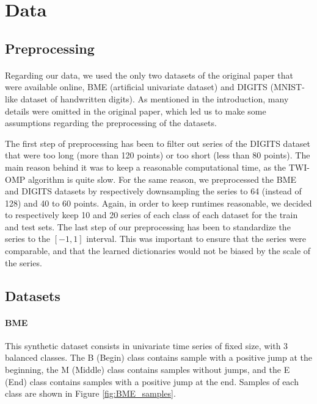 \documentclass[11pt]{article}
\begin{document}
\section{Data}

\subsection{Preprocessing}

\paragraph{} Regarding our data, we used the only two datasets of the original paper that were available online, BME (artificial univariate dataset) and DIGITS (MNIST-like dataset of handwritten digits). As mentioned in the introduction, many details were omitted in the original paper, which led us to make some assumptions regarding the preprocessing of the datasets. 

The first step of preprocessing has been to filter out series of the DIGITS dataset that were too long (more than 120 points) or too short (less than 80 points). The main reason behind it was to keep a reasonable computational time, as the TWI-OMP algorithm is quite slow. For the same reason, we preprocessed the BME and DIGITS datasets by respectively downsampling the series to 64 (instead of 128) and 40 to 60 points. Again, in order to keep runtimes reasonable, we decided to respectively keep 10 and 20 series of each class of each dataset for the train and test sets. The last step of our preprocessing has been to standardize the series to the $[-1, 1]$ interval. This was important to ensure that the series were comparable, and that the learned dictionaries would not be biased by the scale of the series.
    
\subsection{Datasets}

\paragraph{BME} This synthetic dataset consists in univariate time series of fixed size, with 3 balanced classes. The B (Begin) class contains sample with a positive jump at the beginning, the M (Middle) class contains samples without jumps, and the E (End) class contains samples with a positive jump at the end. Samples of each class are shown in Figure \ref{fig:BME_samples}.
\end{document}
